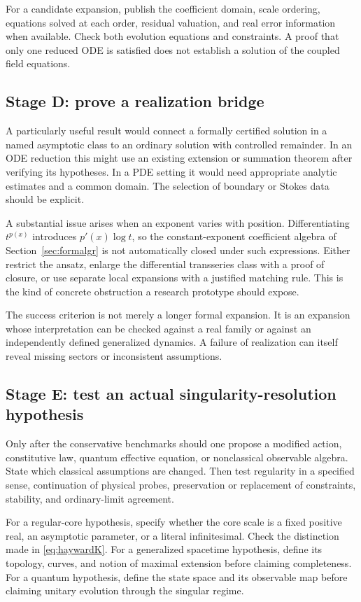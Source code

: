 \documentclass[11pt,a4paper]{article}
\numberwithin{equation}{section}
\theoremstyle{definition}
\theoremstyle{remark}
\begin{document}
For a candidate expansion, publish the coefficient domain, scale ordering, equations solved at each order, residual valuation, and real error information when available. Check both evolution equations and constraints. A proof that only one reduced ODE is satisfied does not establish a solution of the coupled field equations.

\subsection{Stage D: prove a realization bridge}
A particularly useful result would connect a formally certified solution in a named asymptotic class to an ordinary solution with controlled remainder. In an ODE reduction this might use an existing extension or summation theorem after verifying its hypotheses. In a PDE setting it would need appropriate analytic estimates and a common domain. The selection of boundary or Stokes data should be explicit.

A substantial issue arises when an exponent varies with position. Differentiating $t^{p(x)}$ introduces $p'(x)\log t$, so the constant-exponent coefficient algebra of Section~\ref{sec:formalgr} is not automatically closed under such expressions. Either restrict the ansatz, enlarge the differential transseries class with a proof of closure, or use separate local expansions with a justified matching rule. This is the kind of concrete obstruction a research prototype should expose.

The success criterion is not merely a longer formal expansion. It is an expansion whose interpretation can be checked against a real family or against an independently defined generalized dynamics. A failure of realization can itself reveal missing sectors or inconsistent assumptions.

\subsection{Stage E: test an actual singularity-resolution hypothesis}
Only after the conservative benchmarks should one propose a modified action, constitutive law, quantum effective equation, or nonclassical observable algebra. State which classical assumptions are changed. Then test regularity in a specified sense, continuation of physical probes, preservation or replacement of constraints, stability, and ordinary-limit agreement.

For a regular-core hypothesis, specify whether the core scale is a fixed positive real, an asymptotic parameter, or a literal infinitesimal. Check the distinction made in \eqref{eq:haywardK}. For a generalized spacetime hypothesis, define its topology, curves, and notion of maximal extension before claiming completeness. For a quantum hypothesis, define the state space and its observable map before claiming unitary evolution through the singular regime.
\end{document}
